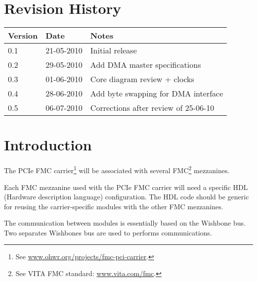 \documentclass[10pt,a4paper]{cerndoc}
\begin{document}
  \cerntitle
  \section*{Revision History}
  \begin{tabularx}{\textwidth}{|p{3cm}|p{3cm}|X|}
    \hline \textbf{Version}&\textbf{Date}&\textbf{Notes}\\ \hline \hline
    0.1 & 21-05-2010 & Initial release\\ \hline
    0.2 & 29-05-2010 & Add DMA master specifications\\ \hline
    0.3 & 01-06-2010 & Core diagram review + clocks\\ \hline
    0.4 & 28-06-2010 & Add byte swapping for DMA interface\\ \hline
    0.5 & 06-07-2010 & Corrections after review of 25-06-10\\ \hline

  \end{tabularx}

  \tableofcontents
  \listoffigures
  \listoftables
  \clearpage


  \section{Introduction}
The PCIe FMC carrier\footnote{See \href{http://www.ohwr.org/projects/fmc-pci-carrier}{www.ohwr.org/projects/fmc-pci-carrier}.} will be associated with several FMC\footnote{See VITA FMC standard: \href{http://www.vita.com/fmc}{www.vita.com/fmc}.} mezzanines. 

Each FMC mezzanine used with the PCIe FMC carrier will need a specific HDL (Hardware description language) configuration. The HDL code should be generic for reusing the carrier-specific modules with the other FMC mezzanines. 

 The communication between modules is essentially based on the Wishbone bus. Two separates Wishbones bus are used to performs communications.
 
\end{document}
